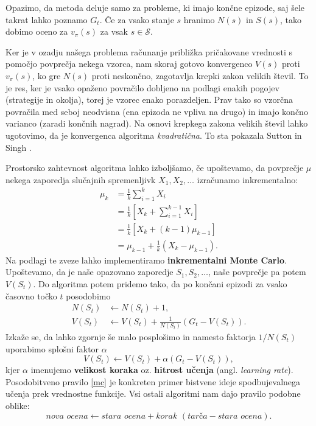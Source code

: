 \documentclass[12pt,a4paper]{amsart}
\theoremstyle{definition} %
\theoremstyle{plain} %
\begin{document}
Opazimo, da metoda deluje samo za probleme, ki imajo končne epizode, saj šele takrat lahko poznamo $G_t$. 
Če za vsako stanje $s$ hranimo $N(s)$ in $S(s)$, tako dobimo oceno za $v_\pi(s)$ za vsak $s \in 
\mathcal{S}$.

Ker je v ozadju našega problema računanje približka pričakovane vrednosti s pomočjo povprečja nekega 
vzorca, nam skoraj gotovo konvergenco $V(s)$ proti $v_\pi(s)$, ko gre $N(s)$ proti neskončno,
zagotavlja krepki zakon velikih števil. To je res, ker je vsako opaženo povračilo dobljeno na podlagi 
enakih pogojev (strategije in okolja), torej je vzorec enako porazdeljen. Prav tako so vzorčna povračila 
med seboj neodvisna (ena epizoda ne vpliva na drugo) in imajo končno varianco (zaradi končnih nagrad). 
Na osnovi krepkega zakona velikih števil lahko ugotovimo, da je konvergenca algoritma \textit{kvadratična}. 
To sta pokazala Sutton in Singh \cite{MCdokaz}.

Prostorsko zahtevnost algoritma lahko izboljšamo, če upoštevamo, da povprečje $\mu$ nekega zaporedja 
slučajnih spremenljivk $X_1, X_2, \dots$ izračunamo inkrementalno:
\begin{align*}
    \mu_k &= \frac{1}{k} \sum_{i = 1}^k X_i \\
        &= \frac{1}{k} \left[X_k + \sum_{i = 1}^{k-1} X_i \right] \\
        &= \frac{1}{k} \left[X_k + (k-1) \mu_{k-1} \right] \\
        &= \mu_{k-1} + \frac{1}{k} \left(X_k - \mu_{k-1} \right).
\end{align*}
Na podlagi te zveze lahko implementiramo \textbf{inkrementalni Monte Carlo}. Upoštevamo, da je naše 
opazovano zaporedje $S_1, S_2, \dots$, naše povprečje pa potem $V(S_t)$. Do algoritma potem pridemo tako, 
da po končani epizodi za vsako časovno točko $t$ posodobimo 
\begin{align*}
    N(S_t) &\leftarrow N(S_t) + 1, \\
    V(S_t) &\leftarrow V(S_t) + \frac{1}{N(S_t)} (G_t - V(S_t)).
\end{align*}
Izkaže se, da lahko zgornje še malo posplošimo in namesto faktorja $1/N(S_t)$ uporabimo splošni 
faktor $\alpha$
\begin{equation}\label{mc}
    V(S_t) \leftarrow V(S_t) + \alpha (G_t - V(S_t)),
\end{equation}
kjer $\alpha$ imenujemo \textbf{velikost koraka} oz. \textbf{hitrost učenja} (angl. 
\textit{learning rate}). Posodobitveno pravilo \eqref{mc} je konkreten primer bistvene ideje 
spodbujevalnega učenja prek vrednostne funkcije. Vsi ostali algoritmi nam dajo pravilo podobne 
oblike: 
\begin{equation}\label{osnova}
    \textit{nova ocena} \leftarrow \textit{stara ocena} + \textit{korak } 
    (\textit{tarča} - \textit{stara ocena}).
\end{equation}
\end{document}
